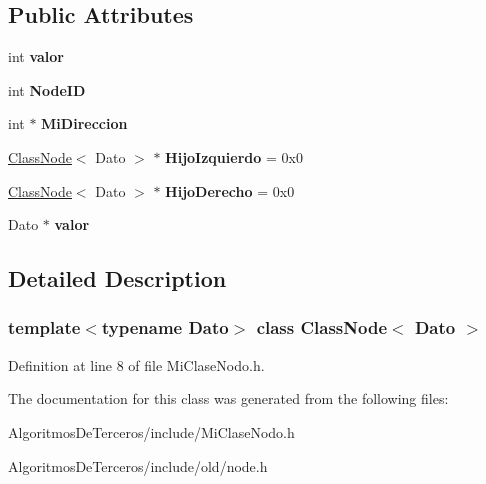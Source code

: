 \subsection*{Public Attributes}
\begin{DoxyCompactItemize}
\item 
\mbox{\label{class_class_node_aed400481896d6e2b48dc1c8ccc0b2641}} 
int {\bfseries valor}
\item 
\mbox{\label{class_class_node_ac874947796e86cf3a56e022bade78df3}} 
int {\bfseries Node\+ID}
\item 
\mbox{\label{class_class_node_afa9601ee48040c32da0c2e2c83d3be13}} 
int $\ast$ {\bfseries Mi\+Direccion}
\item 
\mbox{\label{class_class_node_afc893a99058fd660889c02b8a69505ba}} 
\hyperlink{class_class_node}{Class\+Node}$<$ Dato $>$ $\ast$ {\bfseries Hijo\+Izquierdo} = 0x0
\item 
\mbox{\label{class_class_node_a0c3e529081783a69e38a500ff7dddc20}} 
\hyperlink{class_class_node}{Class\+Node}$<$ Dato $>$ $\ast$ {\bfseries Hijo\+Derecho} = 0x0
\item 
\mbox{\label{class_class_node_a0a597e54b607022b1486e254d8a64880}} 
Dato $\ast$ {\bfseries valor}
\end{DoxyCompactItemize}


\subsection{Detailed Description}
\subsubsection*{template$<$typename Dato$>$\newline
class Class\+Node$<$ Dato $>$}



Definition at line 8 of file Mi\+Clase\+Nodo.\+h.



The documentation for this class was generated from the following files\+:\begin{DoxyCompactItemize}
\item 
Algoritmos\+De\+Terceros/include/Mi\+Clase\+Nodo.\+h\item 
Algoritmos\+De\+Terceros/include/old/node.\+h\end{DoxyCompactItemize}
